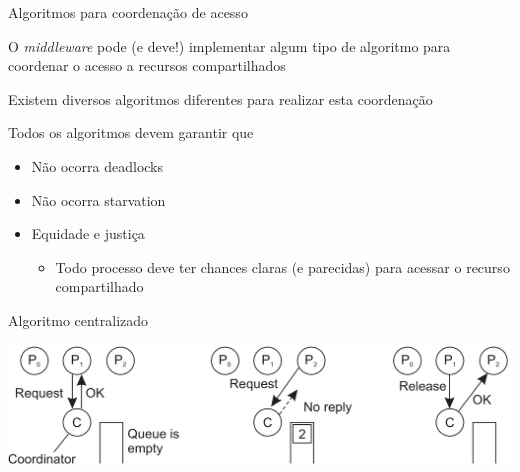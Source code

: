 \documentclass[compress]{beamer}
\begin{document}

\begin{frame}{Algoritmos para coordenação de acesso}

O \textit{middleware} pode (e deve!) implementar algum tipo de algoritmo para coordenar o acesso a recursos compartilhados

\vspace{0.5cm}

Existem diversos algoritmos diferentes para realizar esta coordenação

\vspace{0.5cm}

Todos os algoritmos devem garantir que
\begin{itemize}
    \item Não ocorra deadlocks
    \item Não ocorra starvation
    \item Equidade e justiça
    \begin{itemize}
        \item Todo processo deve ter chances claras (e parecidas) para acessar o recurso compartilhado
    \end{itemize}
\end{itemize}
\end{frame}


\begin{frame}{Algoritmo centralizado}

\vspace{1cm}

\centering \includegraphics[width=\textwidth]{images/centralizado.png}

\end{frame}

\end{document}
